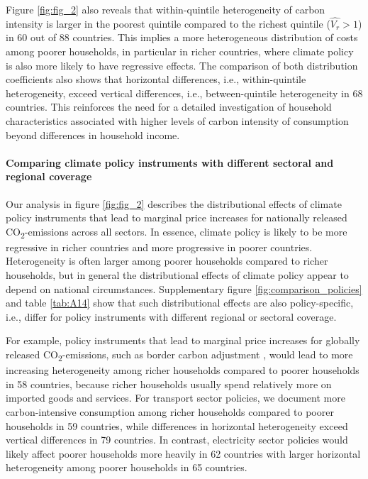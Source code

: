 \documentclass[12pt, a4paper]{article}
\begin{document}
Figure \ref{fig:fig_2} also reveals that within-quintile heterogeneity of carbon intensity is larger in the poorest quintile compared to the richest quintile ($\widehat{V_{r}}>1$) in 60 out of 88 countries. This implies a more heterogeneous distribution of costs among poorer households, in particular in richer countries, where climate policy is also more likely to have regressive effects. The comparison of both distribution coefficients also shows that horizontal differences, i.e., within-quintile heterogeneity, exceed vertical differences, i.e., between-quintile heterogeneity in 68 countries. This reinforces the need for a detailed investigation of household characteristics associated with higher levels of carbon intensity of consumption beyond differences in household income.

\paragraph{Comparing climate policy instruments with different sectoral and regional coverage}

Our analysis in figure \ref{fig:fig_2} describes the distributional effects of climate policy instruments that lead to marginal price increases for nationally released CO\textsubscript{2}-emissions across all sectors. In essence, climate policy is likely to be more regressive in richer countries and more progressive in poorer countries. Heterogeneity is often larger among poorer households compared to richer households, but in general the distributional effects of climate policy appear to depend on national circumstances. Supplementary figure \ref{fig:comparison_policies} and table \ref{tab:A14} show that such distributional effects are also policy-specific, i.e., differ for policy instruments with different regional or sectoral coverage.

For example, policy instruments that lead to marginal price increases for globally released CO\textsubscript{2}-emissions, such as border carbon adjustment \autocite[e.g.,][]{Mehling.2019,Cosbey.2019}, would lead to more increasing heterogeneity among richer households compared to poorer households in 58 countries, because richer households usually spend relatively more on imported goods and services. For transport sector policies, we document more carbon-intensive consumption among richer households compared to poorer households in 59 countries, while differences in horizontal heterogeneity exceed vertical differences in 79 countries. In contrast, electricity sector policies would likely affect poorer households more heavily in 62 countries with larger horizontal heterogeneity among poorer households in 65 countries. 
\end{document}
